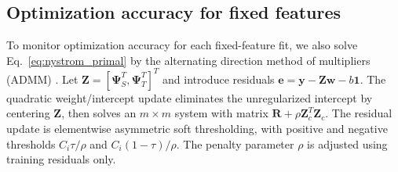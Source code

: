 \subsection{Optimization accuracy for fixed features}\label{sec:solver_accuracy}
{\color{blue}To monitor optimization accuracy for each fixed-feature fit, we also solve Eq.~\eqref{eq:nystrom_primal} by the alternating direction method of multipliers (ADMM) \citep{boyd2011admm}. Let $\boldsymbol{Z}=[\boldsymbol{\Psi}_S^T,\boldsymbol{\Psi}_T^T]^T$ and introduce residuals $\boldsymbol{e}=\boldsymbol{y}-\boldsymbol{Z}\boldsymbol{w}-b\mathbf1$. The quadratic weight/intercept update eliminates the unregularized intercept by centering $\boldsymbol{Z}$, then solves an $m\times m$ system with matrix $\boldsymbol{R}+\rho\boldsymbol{Z}_c^T\boldsymbol{Z}_c$. The residual update is elementwise asymmetric soft thresholding, with positive and negative thresholds $C_i\tau/\rho$ and $C_i(1-\tau)/\rho$. The penalty parameter $\rho$ is adjusted using training residuals only.}

